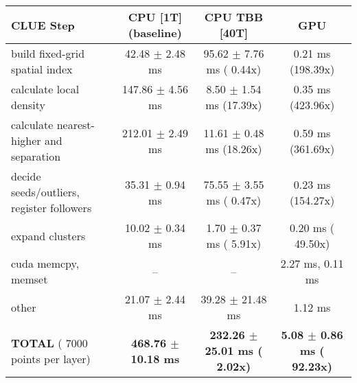     \begin{tabular}{l|c|c|c}
    \hline
    CLUE Step                                 & CPU [1T] (baseline)         & CPU TBB [40T]                         & GPU                       \\ \hline
    build fixed-grid spatial index            &  42.48 $\pm$  2.48 ms       &  95.62 $\pm$  7.76 ms ( 0.44x)        &   0.21 ms (198.39x)       \\
    calculate local density                   & 147.86 $\pm$  4.56 ms       &   8.50 $\pm$  1.54 ms (17.39x)        &   0.35 ms (423.96x)       \\
    calculate nearest-higher and separation   & 212.01 $\pm$  2.49 ms       &  11.61 $\pm$  0.48 ms (18.26x)        &   0.59 ms (361.69x)       \\
    decide seeds/outliers, register followers &  35.31 $\pm$  0.94 ms       &  75.55 $\pm$  3.55 ms ( 0.47x)        &   0.23 ms (154.27x)       \\
    expand clusters                           &  10.02 $\pm$  0.34 ms       &   1.70 $\pm$  0.37 ms ( 5.91x)        &   0.20 ms ( 49.50x)       \\ \hline
    cuda memcpy, memset                       & --                          & --                                    &   2.27 ms,   0.11 ms      \\ 
    other                                     &  21.07 $\pm$  2.44 ms       &  39.28 $\pm$ 21.48 ms                 &   1.12 ms                 \\ \hline
    \textbf{TOTAL} ( 7000 points per layer)   & \textbf{468.76 $\pm$ 10.18 ms} & \textbf{232.26 $\pm$ 25.01 ms ( 2.02x)} & \textbf{  5.08 $\pm$  0.86 ms ( 92.23x)}  \\
    \hline 
    \end{tabular}
    \linebreak


